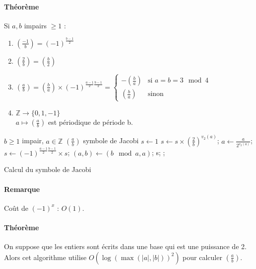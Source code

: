 \documentclass[12pt,a4paper]{report}
\begin{document}
\paragraph{Théorème\\}
Si $a,b$ impairs $\geqslant 1$ :
\begin{enumerate}
\item $ \displaystyle  \left(\frac{-1}{b}\right) = (-1)^{\frac{b-1}{2}}$
\item $ \displaystyle   \left(\frac{2}{b}\right)  =  \left(\frac{b}{2}\right) $
\item $ \displaystyle   \left(\frac{a}{b}\right) =  \left(\frac{b}{a}\right) \times (-1)^{\frac{a-1}{2}\frac{b-1}{2}} = \left\{ 
\begin{array}{ll}
 \displaystyle  - \left(\frac{b}{a}\right) & \mbox{si } a=b=3 \mod 4 \\
 \displaystyle   \left(\frac{b}{a}\right) &\mbox{sinon} 
  \end{array}\right.
  $
\item $ \displaystyle \mathbb{Z} \rightarrow \{0,1,-1\} $\\
$ \displaystyle  a \mapsto  \left(\frac{a}{b}\right) $ est périodique de période b.

\end{enumerate} 
\begin{algorithm}[h!]
\begin{algorithmic}[1]
\REQUIRE $b \geqslant 1$ impair, $a \in \mathbb{Z}$
\ENSURE $ \displaystyle \left(\frac{a}{b}\right)$ symbole de Jacobi
\STATE $s \leftarrow 1$
\STATE $\displaystyle s \leftarrow s \times \left(\frac{2}{b}\right)^{v_2(a)}$; 
\STATE $\displaystyle a \leftarrow \frac{a}{2^{v_2(a)}}$; 
\STATE $\displaystyle s \leftarrow (-1)^{\frac{a-1}{2}\frac{b-1}{2}} \times s$;
\STATE $\displaystyle (a,b) \leftarrow (b\mod a,a)$;
\ENDWHILE
{}
\RETURN s;
\ELSE {};
\ENDIF
\end{algorithmic}
\caption{Calcul du symbole de Jacobi}
\end{algorithm}

\paragraph{Remarque\\}
Coût de $(-1)^x$ : $O(1)$.
\paragraph{Théorème\\}
On suppose que les entiers sont écrits dans une base qui est une puissance de 2. Alors cet algorithme utilise $O(\log(\max(|a|,|b|))^2)$ pour calculer $ \displaystyle \left(\frac{a}{b}\right)$.
\end{document}
